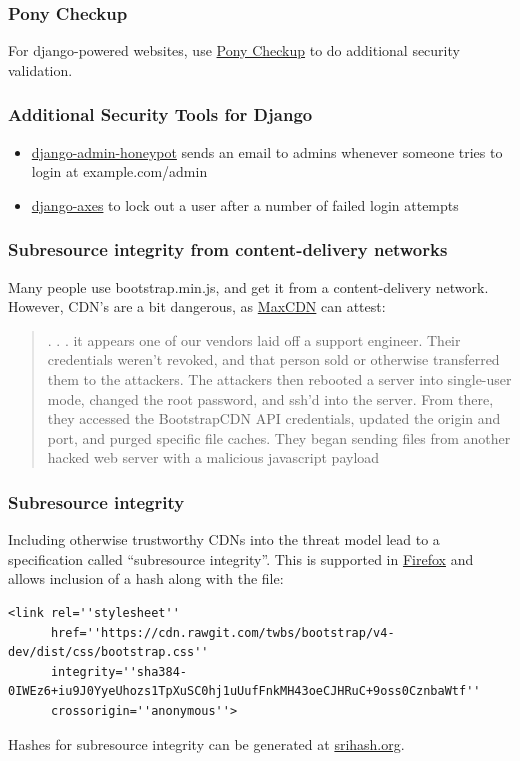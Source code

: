 \documentclass[9pt]{beamer}
\begin{document}
\begin{frame}[fragile]
\frametitle{Pony Checkup}
For django-powered websites, use \href{https://www.ponycheckup.com}{Pony Checkup} to do additional security validation.
\end{frame}

\begin{frame}[fragile]
\frametitle{Additional Security Tools for Django}

\begin{itemize}
\item \href{https://github.com/dmpayton/django-admin-honeypot}{django-admin-honeypot} sends an email to admins whenever someone tries to login at example.com/admin
\item \href{https://pypi.python.org/pypi/django-axes/1.4.0}{django-axes} to lock out a user after a number of failed login attempts
\end{itemize}
\end{frame}

\begin{frame}[fragile]
\frametitle{Subresource integrity from content-delivery networks}
Many people use bootstrap.min.js, and get it from a content-delivery network. However, CDN's are a bit dangerous, as \href{https://www.maxcdn.com/blog/bootstrapcdn-security-post-mortem}{MaxCDN} can attest: 
\begin{quote}
. . . it appears one of our vendors laid off a support engineer. Their credentials weren’t revoked, and that person sold or otherwise transferred them to the attackers. The attackers then rebooted a server into single-user mode, changed the root password, and ssh’d into the  server. From there, they accessed the BootstrapCDN API credentials, updated the origin and port, and purged specific file caches. They began sending files from another hacked web server with a malicious javascript payload
\end{quote}
\end{frame}

\begin{frame}[fragile]
\frametitle{Subresource integrity}
Including otherwise trustworthy CDNs into the threat model lead to a specification called ``subresource integrity''. This is supported in \href{https://hacks.mozilla.org/2015/09/subresource-integrity-in-firefox-43/}{Firefox} and allows inclusion of a hash along with the file:
\begin{verbatim}
<link rel=''stylesheet''
      href=''https://cdn.rawgit.com/twbs/bootstrap/v4-dev/dist/css/bootstrap.css''
      integrity=''sha384-0IWEz6+iu9J0YyeUhozs1TpXuSC0hj1uUufFnkMH43oeCJHRuC+9oss0CznbaWtf''
      crossorigin=''anonymous''>
\end{verbatim}
Hashes for subresource integrity can be generated at \href{https://www.srihash.org/}{srihash.org}.
\end{frame}
\end{document}
